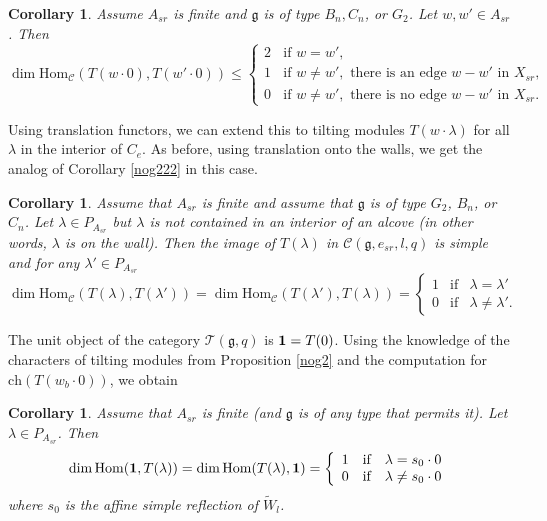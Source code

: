 \documentclass{amsart}
\newtheorem{corollary}[theorem]{Corollary}
\theoremstyle{definition}
\newcommand{\C}{\mathcal{C}}
\newcommand{\g}{\mathfrak{g}}
\newcommand{\T}{\mathcal{T}}
\newcommand{\Hom}{\mathrm{Hom}}
\newcommand{\be}{{\bf 1}}
\numberwithin{equation}{section}
\begin{document}
\begin{corollary} \label{cor:bad weight homs}
    Assume $A_{sr}$ is finite and $\mathfrak g$ is of type $B_n, C_n$, or $G_2$. Let $w, w'\in A_{sr}$. Then
    $$
    \dim\Hom_\C(T(w\cdot 0), T(w'\cdot 0))\le \begin{cases}
        2 \;\; \text{ if } w=w',\\
        1 \;\; \text{ if } w\neq w', \text{ there is an edge } w-w' \text{ in } X_{sr},\\
        0 \;\; \text{ if } w\neq w', \text{ there is no edge } w-w' \text{ in } X_{sr}.
    \end{cases}
    $$
\end{corollary}

Using translation functors, we can extend this to tilting modules $T(w\cdot \lambda)$ for all $\lambda$ in the interior of $C_e$. As before, using translation onto the walls, we get the analog of Corollary \ref{nog222} in this case.
\begin{corollary}
    \label{cor:on the  wall}
Assume that $A_{sr}$ is finite and assume that $\g$ is of type $G_2$, $B_n$, or $C_n$. Let $\lambda \in P_{A_{sr}}$
but $\lambda$ is not contained in an interior of an alcove (in other words, $\lambda$ is on the wall). Then the image of $T(\lambda)$ in $\mathcal C(\mathfrak g, e_{sr}, l, q)$ is simple and for any $\lambda' \in P_{A_{sr}}$ 
$$\dim \Hom_\C(T(\lambda), T(\lambda'))=\dim \Hom_\C(T(\lambda'),T(\lambda))=\left\{ \begin{array}{ccc} 1&\mbox{if}&\lambda=\lambda'\\ 0&\mbox{if}&\lambda \ne \lambda'. \end{array}\right.
$$
\end{corollary}

The unit object of the category $\T(\g,q)$ is $\be=T(0)$. Using the knowledge of the characters
of tilting modules from Proposition \ref{nog2} and  the computation for $\mbox{ch}(T(w_b\cdot 0))$,  we obtain

\begin{corollary}\label{nog2unit}
Assume that $A_{sr}$ is finite (and $\mathfrak g$ is of any type that permits it). Let $\lambda \in P_{A_{sr}}$.
Then 
$$\dim \Hom(\be, T(\lambda))=\dim \Hom(T(\lambda),\be)=\left\{ \begin{array}{ccc} 1&\mbox{if}&\lambda=s_0\cdot 0\\ 0&\mbox{if}&\lambda \ne s_0\cdot 0 \end{array}\right.
$$
where $s_0$ is the affine simple reflection of $\tilde W_l$.
\end{corollary}
 
\end{document}
